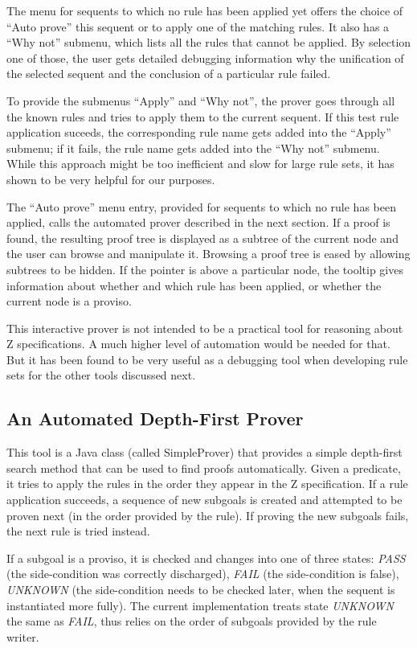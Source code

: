 \documentclass{entcs}
\begin{document}
The menu for sequents to which no rule has been applied yet offers the
choice of ``Auto prove'' this sequent or to apply one of the matching
rules.  It also has a ``Why not'' submenu, which lists all the rules
that cannot be applied.  By selection one of those, the user gets
detailed debugging information why the unification of the selected
sequent and the conclusion of a particular rule failed.

To provide the submenus ``Apply'' and ``Why not'', the prover goes
through all the known rules and tries to apply them to the current
sequent.  If this test rule application suceeds, the corresponding
rule name gets added into the ``Apply'' submenu; if it fails, the rule
name gets added into the ``Why not'' submenu.  While this approach
might be too inefficient and slow for large rule sets, it has shown to
be very helpful for our purposes.

The ``Auto prove'' menu entry, provided for sequents to which no rule
has been applied, calls the automated prover described in the next
section.  If a proof is found, the resulting proof tree is displayed
as a subtree of the current node and the user can browse and
manipulate it.  Browsing a proof tree is eased by allowing subtrees to
be hidden.  If the pointer is above a particular node, the tooltip
gives information about whether and which rule has been applied, or
whether the current node is a proviso.

This interactive prover is not intended to be a practical tool for
reasoning about Z specifications.  A much higher level of automation
would be needed for that.  But it has been found to be very useful as
a debugging tool when developing rule sets for the other tools discussed
next. 

\subsection{An Automated Depth-First Prover}

This tool is a Java class (called SimpleProver) that provides a simple
depth-first search method that can be used to find proofs automatically.
Given a predicate, it tries to apply the rules in the order they
appear in the Z specification.  If a rule application succeeds, a
sequence of new subgoals is created and attempted to be proven next
(in the order provided by the rule).  If proving the new subgoals
fails, the next rule is tried instead.

If a subgoal is a proviso, it is checked and changes into one of three
states: \emph{PASS} (the side-condition was correctly discharged),
\emph{FAIL} (the side-condition is false), \emph{UNKNOWN} (the
side-condition needs to be checked later, when the sequent is
instantiated more fully).  The current implementation treats state
\emph{UNKNOWN} the same as \emph{FAIL}, thus relies on the order of
subgoals provided by the rule writer.
\end{document}

